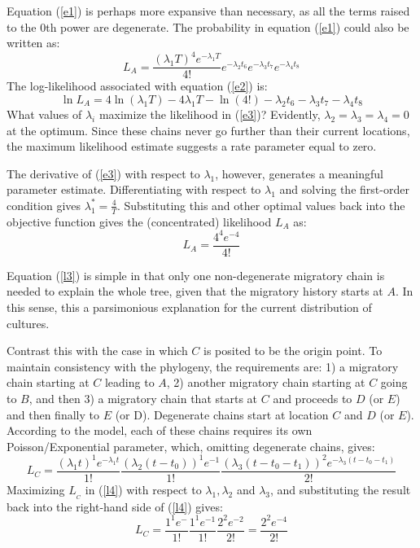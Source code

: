 \documentclass[11pt]{article}
\begin{document}
Equation (\ref{e1}) is perhaps more expansive than necessary, as all the terms raised to the $0$th power are degenerate. The probability in equation (\ref{e1}) could also be written as:
\begin{equation} \label{e2}
L_A = \frac{(\lambda_1 T)^4e^{-\lambda_1T}}{4!}e^{-\lambda_2t_6}e^{-\lambda_3t_7}e^{-\lambda_4t_8}
\end{equation} 
The log-likelihood associated with equation (\ref{e2}) is:
\begin{equation} \label{e3}
\ln L_A  = 4\ln(\lambda_1 T) -4\lambda_1T-\ln(4!)-\lambda_2t_6-\lambda_3t_7-\lambda_4t_8
\end{equation} 
What values of $\lambda_i$ maximize the likelihood in (\ref{e3})? Evidently, $\lambda_2=\lambda_3=\lambda_4=0$ at the optimum. Since these chains never go further than their current locations, the maximum likelihood estimate suggests a rate parameter equal to zero. 

The derivative of (\ref{e3}) with respect to $\lambda_1$, however, generates a meaningful parameter estimate. Differentiating with respect to $\lambda_1$ and solving the first-order condition gives $\lambda_1^*=\frac{4}{T}$. Substituting this and other optimal values back into the objective function gives the (concentrated) likelihood $L_A$ as:
\begin{equation}  \label{l3}
L_A=\frac{4^4e^{-4}}{4!}
\end{equation}

Equation (\ref{l3}) is simple in that only one non-degenerate migratory chain is needed to explain the whole tree, given that the migratory history starts at $A$. In this sense, this a parsimonious explanation for the current distribution of cultures. 

Contrast this with the case in which $C$ is posited to be the origin point. To maintain consistency with the phylogeny, the requirements are:  1) a migratory chain starting at $C$ leading to $A$, 2) another migratory chain starting at $C$ going to $B$, and then 3) a migratory chain that starts at $C$ and proceeds to $D$ (or $E$) and then finally to $E$ (or D). Degenerate chains start at location $C$ and $D$ (or $E$). According to the model, each of these chains requires its own Poisson/Exponential parameter, which, omitting degenerate chains, gives:
\begin{equation} \label{l4}
L_{C}=\frac{(\lambda_1t)^1e^{-\lambda_1t}}{1!}\frac{(\lambda_2(t-t_0))^1e^{-1}}{1!}
\frac{(\lambda_3(t-t_0-t_1))^2e^{-\lambda_3(t-t_0-t_1)}}{2!}
\end{equation} 
Maximizing $L_{}_{C}$ in (\ref{l4}) with respect to $\lambda_1,\lambda_2$ and $\lambda_3$, and substituting the result back into the right-hand side of (\ref{l4}) gives:
\begin{equation} \label{l5}
L_{C}=\frac{1^1e^{-}}{1!}\frac{1^{1}e^{-1}}{1!}\frac{2^2e^{-2}}{2!}=
\frac{2^2e^{-4}}{2!}
\end{equation} 
\end{document}
